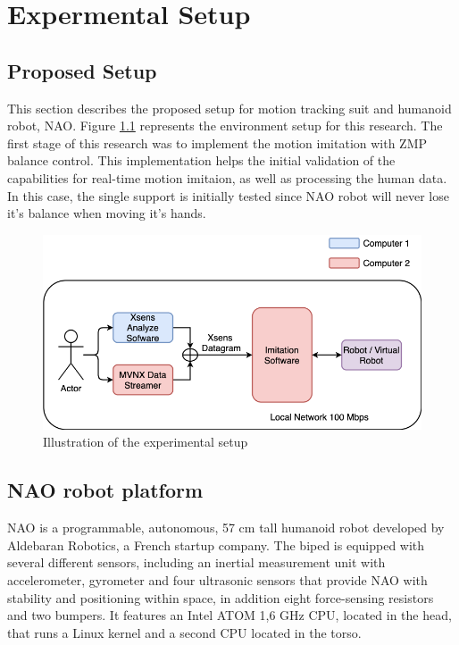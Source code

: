 \chapter{Expermental Setup}


\section{Proposed Setup}

This section describes the proposed setup for motion tracking suit and humanoid robot, NAO. Figure \ref{fig: experimental-setup} represents the environment setup for this research.
The first stage of this research was to implement the motion imitation with ZMP balance control. This implementation helps the initial validation of the capabilities for real-time motion imitaion, 
as well as processing the human data. In this case, the single support is initially tested since NAO robot will never lose it's balance when moving it's hands.

\begin{figure}[h!]
    \centering
    \includegraphics[scale=0.5]{images/flowchart-experimental-setup.png}\hfill
    \caption{Illustration of the experimental setup}\hfill
    \label{fig: experimental-setup}
\end{figure}

\section{NAO robot platform}

NAO is a programmable, autonomous, 57 cm tall humanoid robot developed by Aldebaran Robotics, a French startup company. The biped is equipped with several
different sensors, including an inertial measurement unit with accelerometer, gyrometer and four ultrasonic sensors that provide NAO with stability and 
positioning within space, in addition eight force-sensing resistors and two bumpers. It features an Intel ATOM 1,6 GHz CPU, located in the head, that runs
 a Linux kernel and a second CPU located in the torso.



